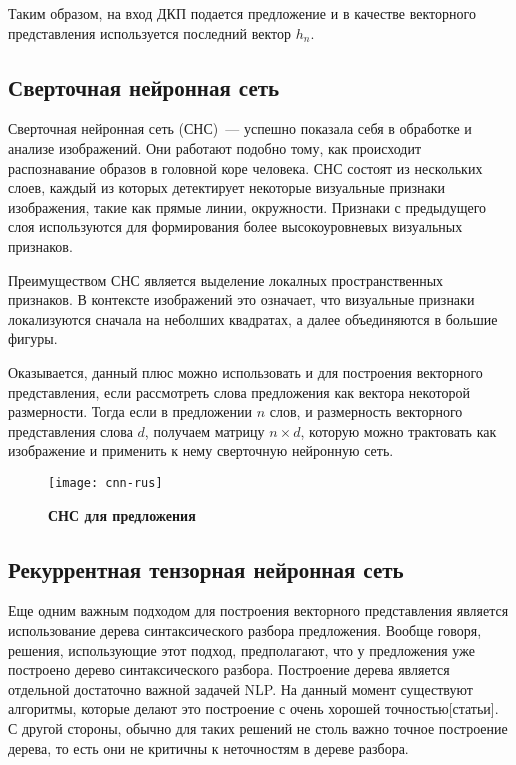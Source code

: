 Таким образом, на вход ДКП подается предложение и в качестве векторного представления используется
последний вектор $h_n$.

\subsection{Сверточная нейронная сеть}
Сверточная нейронная сеть (СНС)~--- успешно показала себя в обработке и анализе изображений. Они работают подобно тому, как происходит распознавание образов в головной коре человека. СНС состоят из нескольких слоев, каждый из которых детектирует некоторые визуальные признаки изображения, такие как прямые линии, окружности. Признаки с предыдущего слоя используются для формирования более высокоуровневых визуальных признаков.

Преимуществом СНС является выделение локалных пространственных признаков. В контексте изображений это означает, что визуальные признаки локализуются сначала на неболших квадратах, а далее объединяются в большие фигуры.

Оказывается, данный плюс можно использовать и для построения векторного представления, 
если рассмотреть слова предложения как вектора некоторой размерности. Тогда если в предложении $n$ слов, 
и размерность векторного представления слова $d$, получаем матрицу $n \times d$, 
которую можно трактовать как изображение и применить к нему сверточную нейронную сеть\cite{Lecun98gradient-basedlearning, DBLP:journals/corr/Kim14f}.

\begin{figure}[h]
\texttt{[image: cnn-rus]}
\caption{\textbf{СНС для предложения}}
\label{fig:cnn}
\end{figure}

\subsection{Рекуррентная тензорная нейронная сеть}
Еще одним важным подходом для построения векторного представления является использование 
дерева синтаксического разбора предложения. Вообще говоря, решения, использующие этот подход, предполагают, что у предложения уже построено дерево синтаксического разбора. Построение дерева является отдельной достаточно важной задачей NLP. На данный момент существуют алгоритмы, которые делают это построение с очень хорошей точностью[статьи]. 
С другой стороны, обычно для таких решений не столь важно точное построение дерева, то есть они не критичны к неточностям в дереве разбора.

